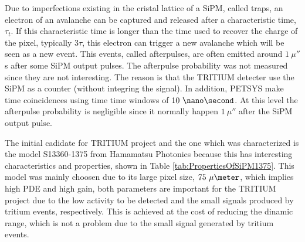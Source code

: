 Due to imperfections existing in the cristal lattice of a SiPM, called traps, an electron of an avalanche can be captured and released after a characteristic time, $\tau_t$. If this characteristic time is longer than the time used to recover the charge of the pixel, typically $3\tau$, this electron can trigger a new avalanche which will be seen as a new event. This events, called  afterpulses, are often emitted around $1~\mu\second$s after some SiPM output pulses. The afterpulse probability was not measured since they are not interesting. The reason is that the TRITIUM detecter use the SiPM as a counter (without integring the signal). In addition, PETSYS make time coincidences using time time windows of $10~\nano\second$. At this level the afterpulse probability is negligible since it normally happen $1~\mu\second$ after the SiPM output pulse.

The initial cadidate for TRITIUM project and the one which was characterized is the model S13360-1375 from Hamamatsu Photonics \cite{DataSheetHammamatsu_1_SiPM_1375} because this has interesting characteristics and properties, shown in Table \ref{tab:PropertiesOfSiPM1375}. This model was mainly choosen due to its large pixel size, $75~\mu\meter$, which implies high PDE and high gain, both parameters are important for the TRITIUM project due to the low activity to be detected and the small signals produced by tritium events, respectively. This is achieved at the cost of reducing the dinamic range, which is not a problem due to the small signal generated by tritium events. 

